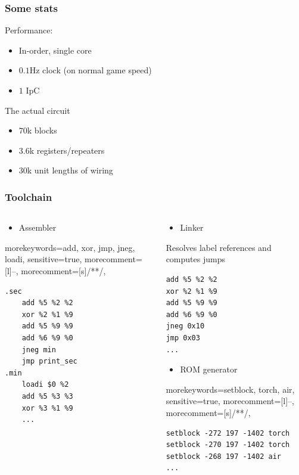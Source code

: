 \documentclass[aspectratio=169]{beamer}
\begin{document}
\begin{frame}
	\frametitle{Some stats}

	Performance:
	\begin{itemize}
		\item In-order, single core
		\item $0.1$Hz clock (on normal game speed)
		\item $1$ IpC
	\end{itemize}

	The actual circuit
	\begin{itemize}
		\item $70$k blocks
		\item $3.6$k registers/repeaters
		\item $30$k unit lengths of wiring
	\end{itemize}
\end{frame}

\begin{frame}[fragile]
	\frametitle{Toolchain}
	\begin{columns}
		\begin{column}{0.4\textwidth}
			\begin{itemize}
				\item Assembler
			\end{itemize}
			{morekeywords={add, xor, jmp, jneg, loadi},
				sensitive=true,
				morecomment=[l]{--},
				morecomment=[s]{/*}{*/},
			}
			\lstset{language=asm}
			\begin{lstlisting}
.sec
	add %5 %2 %2
	xor %2 %1 %9
	add %5 %9 %9
	add %6 %9 %0
	jneg min
	jmp print_sec
.min
	loadi $0 %2
	add %5 %3 %3
	xor %3 %1 %9
    ...
	\end{lstlisting}
		\end{column}
		\pause
		\begin{column}{0.6\textwidth}
			\begin{itemize}
				\item Linker
			\end{itemize}
			Resolves label references and computes jumps
			\lstset{language=asm}
			\begin{lstlisting}
add %5 %2 %2
xor %2 %1 %9
add %5 %9 %9
add %6 %9 %0
jneg 0x10
jmp 0x03
...
	\end{lstlisting}
			\pause
			\begin{itemize}
				\item ROM generator
			\end{itemize}
			{morekeywords={setblock, torch, air},
				sensitive=true,
				morecomment=[l]{--},
				morecomment=[s]{/*}{*/},
			}
			\lstset{language=command}
			\begin{lstlisting}
setblock -272 197 -1402 torch
setblock -270 197 -1402 torch
setblock -268 197 -1402 air
...
    \end{lstlisting}
		\end{column}
	\end{columns}
\end{frame}
\end{document}
